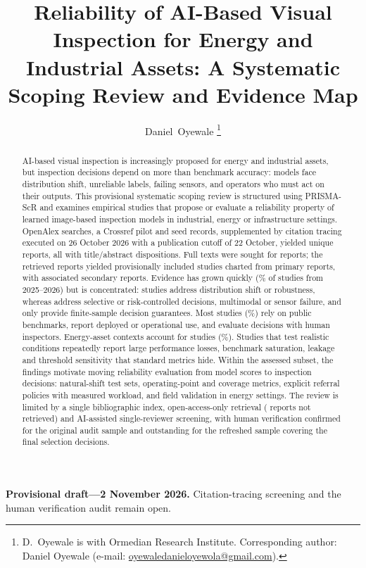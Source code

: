 \documentclass[journal]{IEEEtran}
\begin{document}
\title{Reliability of AI-Based Visual Inspection for Energy and Industrial Assets:
A Systematic Scoping Review and Evidence Map}
\author{Daniel~Oyewale%
\thanks{D.~Oyewale is with Ormedian Research Institute. Corresponding author: Daniel Oyewale (e-mail: \href{mailto:oyewaledanieloyewola@gmail.com}{oyewaledanieloyewola@gmail.com}).}}
\maketitle
\begin{center}\small\textbf{Provisional draft---2 November 2026.} Citation-tracing screening and the human verification audit remain open.\end{center}

\begin{abstract}
AI-based visual inspection is increasingly proposed for energy and industrial assets, but inspection decisions depend on more than benchmark accuracy: models face distribution shift, unreliable labels, failing sensors, and operators who must act on their outputs. This provisional systematic scoping review is structured using PRISMA-ScR and examines empirical studies that propose or evaluate a reliability property of learned image-based inspection models in industrial, energy or infrastructure settings. OpenAlex searches, a Crossref pilot and seed records, supplemented by citation tracing executed on 26 October 2026 with a publication cutoff of 22 October, yielded \nUniqueReports{} unique reports, all with title/abstract dispositions. Full texts were sought for \nSought{} reports; the \nAssessed{} retrieved reports yielded \nIncluded{} provisionally included studies charted from \nIncluded{} primary reports, with \nSecondary{} associated secondary reports. Evidence has grown quickly (\pctRecent\% of studies from 2025--2026) but is concentrated: \nAnyThree{} studies address distribution shift or robustness, whereas \nAnyTwo{} address selective or risk-controlled decisions, \nAnySix{} multimodal or sensor failure, and only \nGuarFS{} provide finite-sample decision guarantees. Most studies (\pctBench\%) rely on public benchmarks, \nDeployed{} report deployed or operational use, and \nHumEval{} evaluate decisions with human inspectors. Energy-asset contexts account for \nEnergy{} studies (\pctEnergy\%). Studies that test realistic conditions repeatedly report large performance losses, benchmark saturation, leakage and threshold sensitivity that standard metrics hide. Within the assessed subset, the findings motivate moving reliability evaluation from model scores to inspection decisions: natural-shift test sets, operating-point and coverage metrics, explicit referral policies with measured workload, and field validation in energy settings. The review is limited by a single bibliographic index, open-access-only retrieval (\nNotRetrieved{} reports not retrieved) and AI-assisted single-reviewer screening, with human verification confirmed for the original audit sample and outstanding for the refreshed sample covering the final selection decisions.
\end{abstract}
\end{document}
